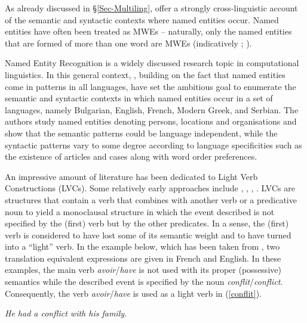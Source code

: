 \documentclass[output=paper]{langsci/langscibook}
\begin{document}
As already discussed in §\ref{Sec-Multiling},  
offer a strongly cross-linguistic account of the semantic and syntactic contexts where named entities occur. 
Named entities have often been treated as MWEs -- naturally, only the named entities that are formed of more than one word are MWEs (indicatively \citealt{Downey:al:07}; \citealt{vincze2011}). 

Named Entity Recognition   is a widely discussed research topic in computational linguistics. 
In this general context, \citeauthor{KoevaEtal2018tv}, building on the fact that named entities come in patterns in all languages, have set the ambitious goal to enumerate the semantic and syntactic contexts in which named entities occur in a set of languages, namely Bulgarian, English, French, Modern Greek, and Serbian. 
The authors study named entities denoting persons, locations and organisations and show that the semantic patterns could be language independent, while the syntactic patterns vary to some degree according to language specificities such as the existence of articles and cases along with word order preferences.


An impressive amount of literature has been dedicated to Light Verb Constructions  (LVCs). Some relatively early approaches include \citet{Jespersen:65},  \citet{Gross1988a}, \citet{Butt:95}, \citet{Melchuk:98}. LVCs are structures that contain a verb that combines with another verb or a predicative noun to yield a monoclausal structure in which the event described is not specified by the (first) verb but by the other predicates. In a sense, the (first) verb is considered to have lost some of its semantic weight and to have turned into a ``light'' verb. In the example below, which has been taken from %
, two translation equivalent expressions are given in French and English. In these examples, the main verb \textit{avoir}/\textit{have} is not used with its proper (possessive) semantics while the described event is specified by the noun \textit{conflit}/\textit{conflict}. Consequently, the verb \textit{avoir}/\textit{have} is used as a light verb in (\ref{conflit}). 

\begin{exe}
\ex \label{conflit} 
\settowidth {}
\begin{xlist}
\ex  \textit{He had a conflict with his family.}
\end{xlist}
\end{exe}
\end{document}

